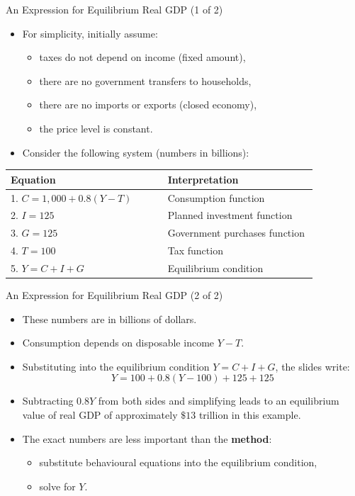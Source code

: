 \documentclass[aspectratio=169]{beamer}
\begin{document}
\begin{frame}{An Expression for Equilibrium Real GDP (1 of 2)}
\transfade
\begin{itemize}[<+->]
  \item For simplicity, initially assume:
  \begin{itemize}[<+->]
    \item taxes do not depend on income (fixed amount),
    \item there are no government transfers to households,
    \item there are no imports or exports (closed economy),
    \item the price level is constant.
  \end{itemize}
  \item Consider the following system (numbers in billions):
\end{itemize}
\begin{center}
\small
\begin{tabular}{p{0.44\linewidth} p{0.42\linewidth}}
\toprule
\textbf{Equation} & \textbf{Interpretation} \\
\midrule
1. \( C = 1{,}000 + 0.8(Y - T) \) & Consumption function \\
2. \( I = 125 \) & Planned investment function \\
3. \( G = 125 \) & Government purchases function \\
4. \( T = 100 \) & Tax function \\
5. \( Y = C + I + G \) & Equilibrium condition \\
\bottomrule
\end{tabular}
\end{center}
\end{frame}

\begin{frame}{An Expression for Equilibrium Real GDP (2 of 2)}
\transfade
\begin{itemize}[<+->]
  \item These numbers are in billions of dollars.
  \item Consumption depends on disposable income \(Y - T\).
  \item Substituting into the equilibrium condition \(Y = C + I + G\), the slides write:
  \[
    Y = 100 + 0.8(Y - 100) + 125 + 125
  \]
  \item Subtracting \(0.8Y\) from both sides and simplifying leads to an equilibrium value of real GDP of approximately \(\$13\) trillion in this example.
  \item The exact numbers are less important than the \textbf{method}:
  \begin{itemize}[<+->]
    \item substitute behavioural equations into the equilibrium condition,
    \item solve for \(Y\).
  \end{itemize}
\end{itemize}
\end{frame}
\end{document}
